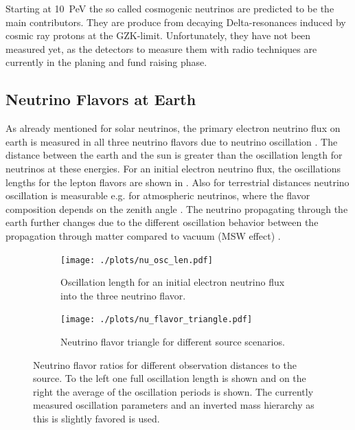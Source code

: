 Starting at \SI{10}{PeV} the so called cosmogenic neutrinos are predicted to be the main contributors.
They are produce from decaying Delta-resonances induced by cosmic ray protons at the GZK-limit.
Unfortunately, they have not been measured yet, as the detectors to measure them with radio techniques are currently in the planing and fund raising phase.

\subsection{Neutrino Flavors at Earth} \label{sec:nu_osc}

As already mentioned for solar neutrinos, the primary electron neutrino flux on earth is measured in all three neutrino flavors due to neutrino oscillation \cite{SNO01Oscillation}.
The distance between the earth and the sun is greater than the oscillation length for neutrinos at these energies.
For an initial electron neutrino flux, the oscillations lengths for the lepton flavors are shown in .
Also for terrestrial distances neutrino oscillation is measurable e.g. for atmospheric neutrinos, where the flavor composition depends on the zenith angle \cite{SK98Oscillation}.
The neutrino propagating through the earth further changes due to the different oscillation behavior between the propagation through matter compared to vacuum (MSW effect) \cite{Mikheyev85, Wolfenstein79}.

\begin{figure}
    \centering
    \begin{subfigure}[t]{0.47\textwidth}
        \centering
        \texttt{[image: ./plots/nu\_osc\_len.pdf]}
        \caption{Oscillation length for an initial electron neutrino flux into the three neutrino flavor.}
        \label{fig:nu_osc_len}
    \end{subfigure}
    \hfill
    \begin{subfigure}[t]{0.47\textwidth}
        \centering
        \texttt{[image: ./plots/nu\_flavor\_triangle.pdf]}
        \caption{Neutrino flavor triangle for different source scenarios.}
        \label{fig:nu_flavor_trangle}
    \end{subfigure}
    \caption{Neutrino flavor ratios for different observation distances to the source. To the left one full oscillation length is shown and on the right the average of the oscillation periods is shown. The currently measured oscillation parameters \cite{PDG20} and  an inverted mass hierarchy as this is slightly favored is used.}
    \label{fig:nu_osc}
\end{figure}

